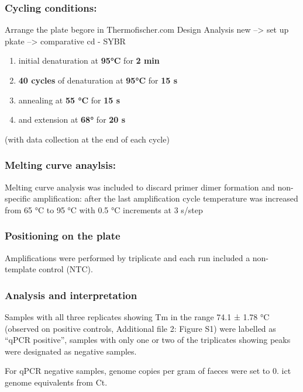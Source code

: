 \documentclass[
]{article}
\providecommand{\tightlist}{%
  \setlength{\itemsep}{0pt}\setlength{\parskip}{0pt}}
\begin{document}
\hypertarget{cycling-conditions}{%
\subsubsection{Cycling conditions:}\label{cycling-conditions}}

Arrange the plate begore in Thermofischer.com Design Analysis new
--\textgreater{} set up pkate --\textgreater{} comparative cd - SYBR

\begin{enumerate}
\def\labelenumi{\arabic{enumi}.}
\tightlist
\item
  initial denaturation at \textbf{95°C} for \textbf{2 min}
\item
  \textbf{40 cycles} of denaturation at \textbf{95°C} for \textbf{15 s}
\item
  annealing at \textbf{55 °C} for \textbf{15 s}
\item
  and extension at \textbf{68°} for \textbf{20 s}
\end{enumerate}

(with data collection at the end of each cycle)

\hypertarget{melting-curve-anaylsis}{%
\subsubsection{Melting curve anaylsis:}\label{melting-curve-anaylsis}}

Melting curve analysis was included to discard primer dimer formation
and non-specific amplification: after the last amplification cycle
temperature was increased from 65 °C to 95 °C with 0.5 °C increments at
3 s/step

\hypertarget{positioning-on-the-plate}{%
\subsubsection{Positioning on the
plate}\label{positioning-on-the-plate}}

Amplifications were performed by triplicate and each run included a
non-template control (NTC).

\hypertarget{analysis-and-interpretation}{%
\subsubsection{Analysis and
interpretation}\label{analysis-and-interpretation}}

Samples with all three replicates showing Tm in the range 74.1 ± 1.78 °C
(observed on positive controls, Additional file 2: Figure S1) were
labelled as ``qPCR positive'', samples with only one or two of the
triplicates showing peaks were designated as negative samples.

For qPCR negative samples, genome copies per gram of faeces were set to
0. ict genome equivalents from Ct.
\end{document}
